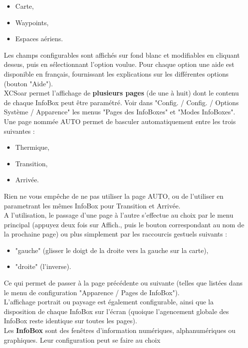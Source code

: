 \documentclass{article}
\begin{document}
\begin{itemize}
\item Carte,
\item Waypoints,
\item Espaces aériens.
\end{itemize}
Les champs configurables sont affichés sur fond blanc et modifiables en cliquant dessus, puis en sélectionnant l'option voulue. Pour chaque option une aide est disponible en français, fournissant les explications sur les différentes options (bouton "Aide").\\
%
\newline
%
XCSoar permet l'affichage de \textbf{plusieurs pages} (de une à huit) dont le contenu de chaque InfoBox peut être paramétré. Voir dans "Config. / Config. / Options Système / Apparence" les menus "Pages des InfoBoxes" et "Modes InfoBoxes".\\
Une page nommée AUTO permet de basculer automatiquement entre les trois suivantes :
\begin{itemize}
\item Thermique,
\item Transition,
\item Arrivée.
\end{itemize}
Rien ne vous empêche de ne pas utiliser la page AUTO, ou de l'utiliser en parametrant les mêmes InfoBox pour Transition et Arrivée.\\
A l'utilisation, le passage d'une page à l'autre s'effectue au choix par le menu principal (appuyez deux fois sur Affich., puis le bouton correspondant au nom de la prochaine page) ou plus simplement par les raccourcis gestuels suivants :
\begin{itemize}
\item "gauche" (glisser le doigt de la droite vers la gauche sur la carte),
\item "droite" (l'inverse).
\end{itemize}
Ce qui permet de passer à la page précédente ou suivante (telles que listées dans le menu de configuration "Apparence / Pages de InfoBox").\\
%
L'affichage portrait ou paysage est également configurable, ainsi que la disposition de chaque InfoBox sur l'écran (quoique l'agencement globale des InfoBox reste identique sur toutes les pages).\\
%
\newline
%
Les \textbf{InfoBox} sont des fenêtres d'information numériques, alphanumériques ou graphiques. Leur configuration peut se faire au choix 
\end{document}

